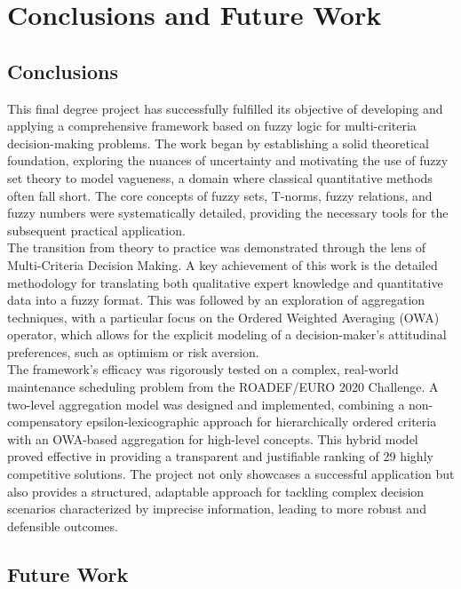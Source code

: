 \chapter*{Conclusions and Future Work}

\section*{Conclusions}

This final degree project has successfully fulfilled its objective of developing and applying a comprehensive framework based on fuzzy logic for multi-criteria decision-making problems. The work began by establishing a solid theoretical foundation, exploring the nuances of uncertainty and motivating the use of fuzzy set theory to model vagueness, a domain where classical quantitative methods often fall short. The core concepts of fuzzy sets, T-norms, fuzzy relations, and fuzzy numbers were systematically detailed, providing the necessary tools for the subsequent practical application.\\

The transition from theory to practice was demonstrated through the lens of Multi-Criteria Decision Making. A key achievement of this work is the detailed methodology for translating both qualitative expert knowledge and quantitative data into a fuzzy format. This was followed by an exploration of aggregation techniques, with a particular focus on the Ordered Weighted Averaging (OWA) operator, which allows for the explicit modeling of a decision-maker's attitudinal preferences, such as optimism or risk aversion.\\

The framework's efficacy was rigorously tested on a complex, real-world maintenance scheduling problem from the ROADEF/EURO 2020 Challenge. A two-level aggregation model was designed and implemented, combining a non-compensatory epsilon-lexicographic approach for hierarchically ordered criteria with an OWA-based aggregation for high-level concepts. This hybrid model proved effective in providing a transparent and justifiable ranking of 29 highly competitive solutions. The project not only showcases a successful application but also provides a structured, adaptable approach for tackling complex decision scenarios characterized by imprecise information, leading to more robust and defensible outcomes.

\section*{Future Work}

